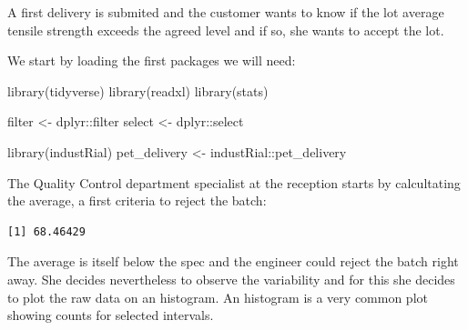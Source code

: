 \documentclass[
]{book}
\newenvironment{Shaded}{\begin{snugshade}}{\end{snugshade}}
\newcommand{\FunctionTok}[1]{\textcolor[rgb]{0.00,0.00,0.00}{#1}}
\newcommand{\NormalTok}[1]{#1}
\newcommand{\OtherTok}[1]{\textcolor[rgb]{0.56,0.35,0.01}{#1}}
\newcommand{\SpecialCharTok}[1]{\textcolor[rgb]{0.00,0.00,0.00}{#1}}
\begin{document}
A first delivery is submited and the customer wants to know if the lot average tensile strength exceeds the agreed level and if so, she wants to accept the lot.

We start by loading the first packages we will need:

\begin{Shaded}
\begin{Highlighting}[]
\FunctionTok{library}\NormalTok{(tidyverse)}
\FunctionTok{library}\NormalTok{(readxl)}
\FunctionTok{library}\NormalTok{(stats)}

\NormalTok{filter }\OtherTok{\textless{}{-}}\NormalTok{ dplyr}\SpecialCharTok{::}\NormalTok{filter}
\NormalTok{select }\OtherTok{\textless{}{-}}\NormalTok{ dplyr}\SpecialCharTok{::}\NormalTok{select}
\end{Highlighting}
\end{Shaded}

\begin{Shaded}
\begin{Highlighting}[]
\FunctionTok{library}\NormalTok{(industRial)}
\NormalTok{pet\_delivery }\OtherTok{\textless{}{-}}\NormalTok{ industRial}\SpecialCharTok{::}\NormalTok{pet\_delivery}
\end{Highlighting}
\end{Shaded}

The Quality Control department specialist at the reception starts by calcultating the average, a first criteria to reject the batch:

\begin{Shaded}
\end{Shaded}

\begin{verbatim}
[1] 68.46429
\end{verbatim}

The average is itself below the spec and the engineer could reject the batch right away. She decides nevertheless to observe the variability and for this she decides to plot the raw data on an histogram. An histogram is a very common plot showing counts for selected intervals.
\end{document}
